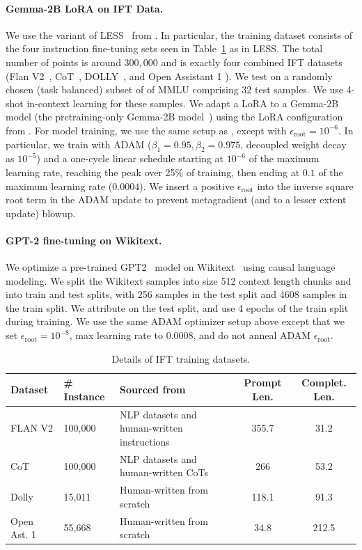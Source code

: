 \paragraph{Gemma-2B LoRA on IFT Data.} We use the variant of
LESS~\citep{xia2024less} from \citet{engstrom2025optimizing}. In particular, the
training dataset consists of the four instruction fine-tuning sets seen in
Table~\ref{tab:ift_training_dataset} as in LESS. The total number of points is
around $300,000$ and is exactly four combined IFT datasets (Flan
  V2~\citep{longpre2023flan}, CoT~\citep{wei2022chain},
  DOLLY~\citep{conover2023free}, and Open Assistant 1
\citep{kopf2024openassistant}). We test on a randomly chosen (task balanced)
subset of of MMLU comprising 32 test samples. We use 4-shot in-context learning
for these samples. We adapt a LoRA to a Gemma-2B model (the pretraining-only
Gemma-2B model~\citep{team2024gemma}) using the LoRA configuration from
\citet{xia2024less}. For model training, we use the same setup as
\citet{engstrom2025optimizing}, except with $\epsilon_\textrm{root}=10^{-6}$. In
particular, we train with ADAM ($\beta_1=0.95, \beta_2=0.975$, decoupled weight
decay as $10^{-5}$) and a one-cycle linear schedule starting at $10^{-6}$ of the
maximum learning rate, reaching the peak over 25\% of training, then ending at
$0.1$ of the maximum learning rate ($0.0004$). We insert a positive
$\epsilon_\textrm{root}$ into the inverse square root term in the ADAM update to
prevent metagradient (and to a lesser extent update) blowup.

\paragraph{GPT-2 fine-tuning on Wikitext.} We optimize a pre-trained
GPT2~\citep{radford2019language} model on Wikitext~\citep{foundation2022english}
using causal language modeling. We split the Wikitext samples into size 512
context length chunks and into train and test splits, with 256 samples in the
test split and 4608 samples in the train split. We attribute on the test split,
and use 4 epochs of the train split during training. We use the same ADAM
optimizer setup above except that we set $\epsilon_\textrm{root}=10^{-8}$, max
learning rate to $0.0008$, and do not anneal ADAM $\epsilon_{\mathrm{root}}$.

\begin{table}[h]
  \small
  \centering
  \caption{Details of IFT training datasets.}
  \label{tab:ift_training_dataset}
  \begin{tabular}{l l l c c}
    \toprule
    Dataset & \# Instance & Sourced from & Prompt Len. & Complet. Len. \\
    \midrule
    FLAN V2 & 100,000 & NLP datasets and human-written instructions &
    355.7 & 31.2 \\
    CoT & 100,000 & NLP datasets and human-written CoTs & 266 & 53.2 \\
    Dolly & 15,011 & Human-written from scratch & 118.1 & 91.3 \\
    Open Ast. 1 & 55,668 & Human-written from scratch & 34.8 & 212.5 \\
    \bottomrule
  \end{tabular}
\end{table}


